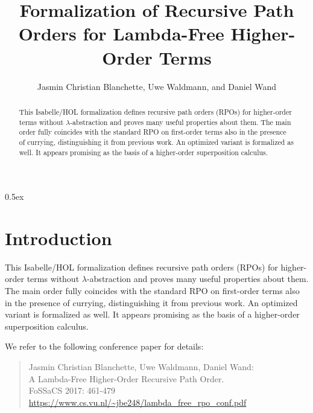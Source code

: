 \documentclass[10pt,a4paper]{article}
\begin{document}
\title{Formalization of Recursive Path Orders for Lambda-Free Higher-Order Terms}
\author{Jasmin Christian Blanchette, Uwe Waldmann, and Daniel Wand}

\maketitle

\begin{abstract}
\noindent
This Isabelle/HOL formalization defines recursive path orders (RPOs) for
higher-order terms without $\lambda$-abstraction and proves many useful
properties about them. The main order fully coincides with the standard RPO on
first-order terms also in the presence of currying, distinguishing it from
previous work. An optimized variant is formalized as well. It appears
promising as the basis of a higher-order superposition calculus.
\end{abstract}

\tableofcontents

\parindent 0pt
\parskip 0.5ex

\section{Introduction}

This Isabelle/HOL formalization defines recursive path orders (RPOs) for
higher-order terms without $\lambda$-abstraction and proves many useful
properties about them. The main order fully coincides with the standard RPO on
first-order terms also in the presence of currying, distinguishing it from
previous work. An optimized variant is formalized as well. It appears
promising as the basis of a higher-order superposition calculus.

We refer to the following conference paper for details:

\begin{quote}
Jasmin Christian Blanchette, Uwe Waldmann, Daniel Wand: \\
A Lambda-Free Higher-Order Recursive Path Order. \\
FoSSaCS 2017: 461-479 \\
\url{https://www.cs.vu.nl/~jbe248/lambda_free_rpo_conf.pdf}
\end{quote}



%
%

%
%
\end{document}
